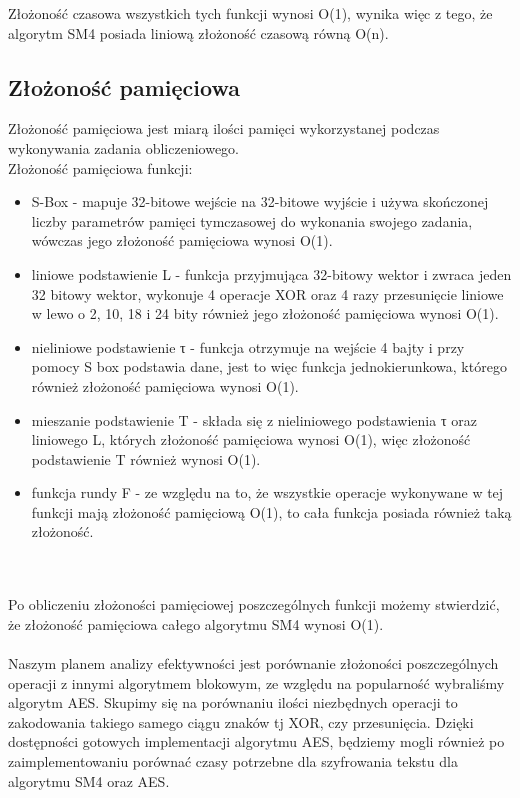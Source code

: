 Złożoność czasowa wszystkich tych funkcji wynosi O(1), wynika więc z tego, że algorytm SM4 posiada liniową złożoność czasową równą O(n).


\subsection{ Złożoność pamięciowa}
Złożoność pamięciowa jest miarą ilości pamięci wykorzystanej podczas wykonywania zadania obliczeniowego.\\

Złożoność pamięciowa funkcji:
\begin{itemize}
    \item S-Box - mapuje 32-bitowe wejście na 32-bitowe wyjście i używa skończonej liczby
parametrów pamięci tymczasowej do wykonania swojego zadania, wówczas jego złożoność pamięciowa wynosi O(1).
    \item liniowe podstawienie L - funkcja przyjmująca 32-bitowy wektor i zwraca jeden 32 bitowy wektor, wykonuje 4 operacje XOR oraz 4 razy przesunięcie liniowe w lewo o 2, 10, 18 i 24 bity również jego złożoność pamięciowa wynosi O(1).
    \item nieliniowe podstawienie τ - funkcja otrzymuje na wejście 4 bajty i przy pomocy S box podstawia dane, jest to więc funkcja jednokierunkowa, którego również złożoność pamięciowa wynosi O(1).
    \item mieszanie podstawienie T  - składa się z nieliniowego podstawienia τ oraz liniowego L, których złożoność pamięciowa wynosi O(1), więc złożoność podstawienie T również wynosi O(1).
    \item funkcja rundy F -  ze względu na to, że wszystkie operacje wykonywane w tej funkcji mają złożoność pamięciową O(1), to cała funkcja posiada również taką złożoność. \\

\end{itemize}\\\\

Po obliczeniu złożoności pamięciowej poszczególnych funkcji możemy stwierdzić, że złożoność pamięciowa całego algorytmu SM4 wynosi O(1).\\\\


Naszym planem analizy efektywności jest porównanie złożoności poszczególnych operacji z innymi algorytmem blokowym, ze względu na popularność wybraliśmy algorytm AES. Skupimy się na porównaniu ilości niezbędnych operacji to zakodowania takiego samego ciągu znaków tj XOR, czy przesunięcia. Dzięki dostępności gotowych implementacji algorytmu AES, będziemy mogli również po zaimplementowaniu porównać czasy potrzebne dla szyfrowania tekstu dla algorytmu SM4 oraz AES. 







